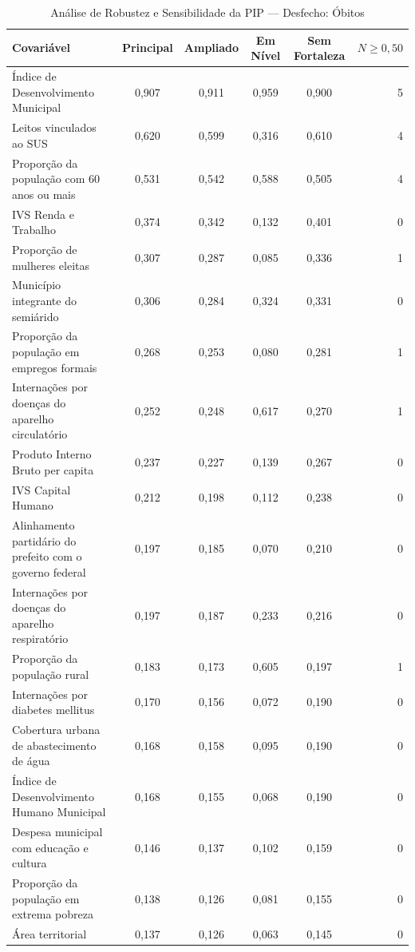 \begin{table}[htbp]
\centering
\footnotesize
\caption{Análise de Robustez e Sensibilidade da PIP — Desfecho: Óbitos}
\label{tab:sens_obitos}
\begin{tabular}{lccccr}
\toprule
\textbf{Covariável} & \textbf{Principal} & \textbf{Ampliado} & \textbf{Em Nível} & \textbf{Sem Fortaleza} & \textbf{$N \ge 0{,}50$} \\
\midrule
Índice de Desenvolvimento Municipal & 0,907 & 0,911 & 0,959 & 0,900 & 5 \\
Leitos vinculados ao SUS & 0,620 & 0,599 & 0,316 & 0,610 & 4 \\
Proporção da população com 60 anos ou mais & 0,531 & 0,542 & 0,588 & 0,505 & 4 \\
IVS Renda e Trabalho & 0,374 & 0,342 & 0,132 & 0,401 & 0 \\
Proporção de mulheres eleitas & 0,307 & 0,287 & 0,085 & 0,336 & 1 \\
Município integrante do semiárido & 0,306 & 0,284 & 0,324 & 0,331 & 0 \\
Proporção da população em empregos formais & 0,268 & 0,253 & 0,080 & 0,281 & 1 \\
Internações por doenças do aparelho circulatório & 0,252 & 0,248 & 0,617 & 0,270 & 1 \\
Produto Interno Bruto per capita & 0,237 & 0,227 & 0,139 & 0,267 & 0 \\
IVS Capital Humano & 0,212 & 0,198 & 0,112 & 0,238 & 0 \\
Alinhamento partidário do prefeito com o governo federal & 0,197 & 0,185 & 0,070 & 0,210 & 0 \\
Internações por doenças do aparelho respiratório & 0,197 & 0,187 & 0,233 & 0,216 & 0 \\
Proporção da população rural & 0,183 & 0,173 & 0,605 & 0,197 & 1 \\
Internações por diabetes mellitus & 0,170 & 0,156 & 0,072 & 0,190 & 0 \\
Cobertura urbana de abastecimento de água & 0,168 & 0,158 & 0,095 & 0,190 & 0 \\
Índice de Desenvolvimento Humano Municipal & 0,168 & 0,155 & 0,068 & 0,190 & 0 \\
Despesa municipal com educação e cultura & 0,146 & 0,137 & 0,102 & 0,159 & 0 \\
Proporção da população em extrema pobreza & 0,138 & 0,126 & 0,081 & 0,155 & 0 \\
Área territorial & 0,137 & 0,126 & 0,063 & 0,145 & 0 \\

\end{tabular}
\end{table}
